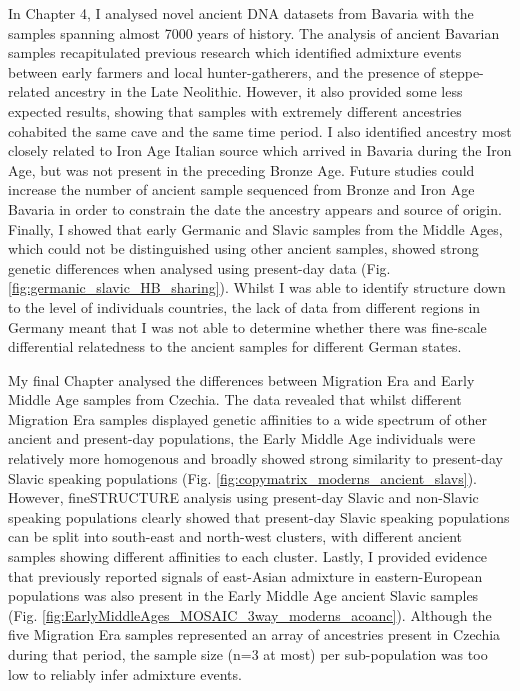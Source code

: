 In Chapter 4, I analysed novel ancient DNA datasets from Bavaria with the samples spanning almost 7000 years of history. The analysis of ancient Bavarian samples recapitulated previous research which identified admixture events between early farmers and local hunter-gatherers, and the presence of steppe-related ancestry in the Late Neolithic. However, it also provided some less expected results, showing that samples with extremely different ancestries cohabited the same cave and the same time period. I also identified ancestry most closely related to Iron Age Italian source which arrived in Bavaria during the Iron Age, but was not present in the preceding Bronze Age. Future studies could increase the number of ancient sample sequenced from Bronze and Iron Age Bavaria in order to constrain the date the ancestry appears and source of origin. Finally, I showed that early Germanic and Slavic samples from the Middle Ages, which could not be distinguished using other ancient samples, showed strong genetic differences when analysed using present-day data (Fig. \ref{fig:germanic_slavic_HB_sharing}). Whilst I was able to identify structure down to the level of individuals countries, the lack of data from different regions in Germany meant that I was not able to determine whether there was fine-scale differential relatedness to the ancient samples for different German states. 

My final Chapter analysed the differences between Migration Era and Early Middle Age samples from Czechia. The data revealed that whilst different Migration Era samples displayed genetic affinities to a wide spectrum of other ancient and present-day populations, the Early Middle Age individuals were relatively more homogenous and broadly showed strong similarity to present-day Slavic speaking populations (Fig. \ref{fig:copymatrix_moderns_ancient_slavs}). However, fineSTRUCTURE analysis using present-day Slavic and non-Slavic speaking populations clearly showed that present-day Slavic speaking populations can be split into south-east and north-west clusters, with different ancient samples showing different affinities to each cluster. Lastly, I provided evidence that previously reported \cite{Hellenthal2014, MOSAIC_2019} signals of east-Asian admixture in eastern-European populations was also present in the Early Middle Age ancient Slavic samples (Fig. \ref{fig:EarlyMiddleAges_MOSAIC_3way_moderns_acoanc}). Although the five Migration Era samples represented an array of ancestries present in Czechia during that period, the sample size (n=3 at most) per sub-population was too low to reliably infer admixture events.  

